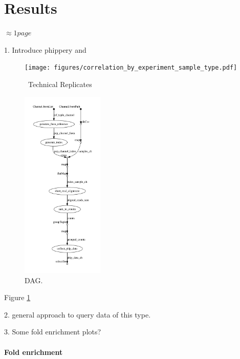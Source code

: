\documentclass{article}
\begin{document}
\section*{Results}

$\approx 1 page$

1. Introduce phippery and 

\begin{figure}[h!!!!]
\centering
\texttt{[image: figures/correlation\_by\_experiment\_sample\_type.pdf]}
\caption{ \
Technical Replicates
}
\label{fig:tech_reps}
\end{figure}

\begin{figure}[h!!!!]
\centering
    \includegraphics[width=0.35\textwidth]{figures/dag-1.png}
    \caption{DAG.}
\label{fig:DAG}
\end{figure}

Figure \ref{fig:tech_reps}

2. general approach to query data of this type.

3. Some fold enrichment plots?


\paragraph{Fold enrichment}
\end{document}
